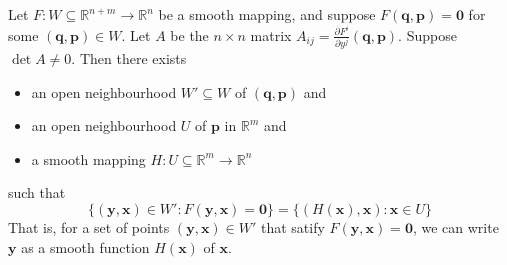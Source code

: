 \documentclass[notoc,notitlepage]{tufte-book}
\begin{document}
\begin{thm}\label{thm:implicit_function_theorem}
  Let $F : W \subseteq \mathbb{R}^{n + m} \to \mathbb{R}^n$ be a smooth mapping,
  and suppose $F(\bm{q}, \bm{p}) = \bm{0}$ for some $(\bm{q}, \bm{p}) \in W$.
  Let $A$ be the $n \times n$ matrix $A_{ij} = \frac{\partial F^i}{\partial y^j}
  (\bm{q}, \bm{p})$. Suppose $\det A \neq 0$. Then there exists
  \begin{itemize}
    \item an open neighbourhood $W' \subseteq W$ of $(\bm{q}, \bm{p})$ and
    \item an open neighbourhood $U$ of $\bm{p}$ in $\mathbb{R}^m$ and
    \item a smooth mapping $H : U \subseteq \mathbb{R}^m \to \mathbb{R}^n$
  \end{itemize}
  such that
  \begin{equation*}
    \{ (\bm{y}, \bm{x}) \in W' : F(\bm{y}, \bm{x}) = \bm{0} \} = \{ (H(\bm{x}),
    \bm{x}) : \bm{x} \in U \}
  \end{equation*}
  That is, for a set of points $(\bm{y}, \bm{x}) \in W'$ that satify $F(\bm{y},
  \bm{x}) = \bm{0}$, we can write $\bm{y}$ as a smooth function $H(\bm{x})$ of
  $\bm{x}$.
\end{thm}



\backmatter

\pagestyle{plain}



\printindex
\end{document}
